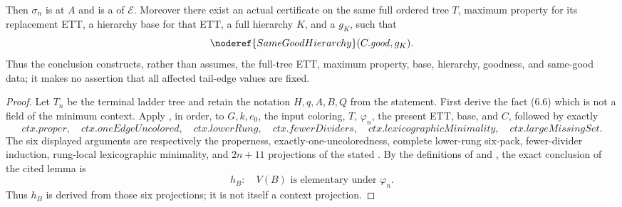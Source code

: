 \begin{lemma}
Then \(\sigma_n\) is  at \(A\) and is a
 of \(\mathcal E\).  Moreover there exist an actual
 certificate on the same full
ordered tree \(T\), maximum property for its replacement ETT, a hierarchy
base for that ETT, a full hierarchy \(K\), and a
 \(g_K\), such that
\[
                 \noderef{SameGoodHierarchy}(C.\mathit{good},g_K).
\]
Thus the conclusion constructs, rather than assumes, the full-tree ETT,
maximum property, base, hierarchy, goodness, and same-good data; it makes
no assertion that all affected tail-edge values are fixed.
\end{lemma}
\begin{proof}
Let \(T_n\) be the terminal ladder tree and retain the notation
\(H,q,A,B,Q\) from the statement.  First derive the fact (6.6) which is
not a field of the minimum context.  Apply
, in order, to
\(G,k,e_0\), the input coloring, \(T\), \(\varphi_n\), the present ETT,
base, and  \(C\), followed by exactly
\[
 \mathit{ctx.proper},\quad \mathit{ctx.oneEdgeUncolored},\quad
 \mathit{ctx.lowerRung},\quad \mathit{ctx.fewerDividers},\quad
 \mathit{ctx.lexicographicMinimality},\quad
 \mathit{ctx.largeMissingSet}.
\]
The six displayed arguments are respectively the properness,
exactly-one-uncoloredness, complete lower-rung six-pack, fewer-divider
induction, rung-local lexicographic minimality, and \(2n+11\) projections
of the stated .  By the
definitions of  and
, the exact conclusion of the cited
lemma is
\[
 h_B:\quad
 V(B)\text{ is elementary under }\varphi_n.                      \tag{0}
\]
Thus \(h_B\) is derived from those six projections; it is not itself a
context projection.


\end{proof}
